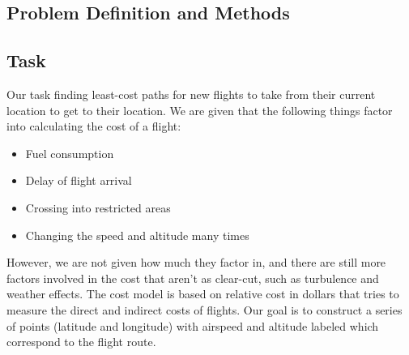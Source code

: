 \documentclass{article}[12pt]
\begin{document}
\begin{multicols}{2}
\section{Problem Definition and Methods}

\subsection{Task}
Our task finding least-cost paths for new flights to take from their current location to get to their location. We are given that the following things factor into calculating the cost of a flight:
	\begin{itemize}
		\item Fuel consumption
		\item Delay of flight arrival
		\item Crossing into restricted areas
		\item Changing the speed and altitude many times
	\end{itemize}
However, we are not given how much they factor in, and there are still more factors involved in the cost that aren't as clear-cut, such as turbulence and weather effects. The cost model is based on relative cost in dollars that tries to measure the direct and indirect costs of flights. Our goal is to construct a series of points (latitude and longitude) with airspeed and altitude labeled which correspond to the flight route.\\


\end{multicols}
\end{document}
